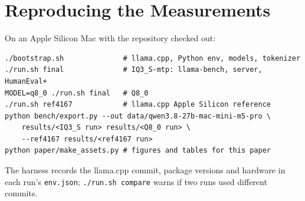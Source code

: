 \documentclass[11pt]{article}
\begin{document}



\appendix
\section{Reproducing the Measurements}

On an Apple Silicon Mac with the repository checked out:
\begin{verbatim}
./bootstrap.sh              # llama.cpp, Python env, models, tokenizer
./run.sh final              # IQ3_S-mtp: llama-bench, server, HumanEval+
MODEL=q8_0 ./run.sh final   # Q8_0
./run.sh ref4167            # llama.cpp Apple Silicon reference
python bench/export.py --out data/qwen3.8-27b-mac-mini-m5-pro \
    results/<IQ3_S run> results/<Q8_0 run> \
    --ref4167 results/<ref4167 run>
python paper/make_assets.py # figures and tables for this paper
\end{verbatim}
The harness records the llama.cpp commit, package versions and hardware in each run's
\texttt{env.json}; \texttt{./run.sh compare} warns if two runs used different commits.
\end{document}
